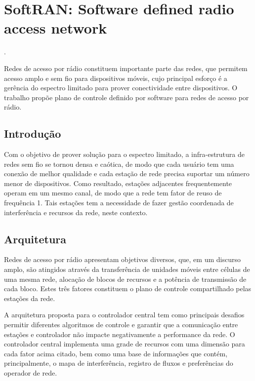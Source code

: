 
\chapter{SoftRAN: Software defined radio access network}
 \cite{gudipati2013softran}.

Redes de acesso por rádio constituem importante parte das redes, que permitem acesso amplo e sem fio para dispositivos móveis, cujo principal esforço é a gerência do espectro limitado para prover conectividade entre dispositivos. O trabalho propõe plano de controle definido por software para redes de acesso por rádio.


\section*{Introdução}

Com o objetivo de prover solução para o espectro limitado, a infra-estrutura de redes sem fio se tornou densa e caótica, de modo que cada usuário tem uma conexão de melhor qualidade e cada estação de rede precisa suportar um número menor de dispositivos. Como resultado, estações adjacentes frequentemente operam em um mesmo canal, de modo que a rede tem fator de reuso de frequência 1. Tais estações tem a necessidade de fazer gestão coordenada de interferência e recursos da rede, neste contexto.


\section*{Arquitetura}

Redes de acesso por rádio apresentam objetivos diversos, que, em um discurso amplo, são atingidos através da transferência de unidades móveis entre células de uma mesma rede, alocação de blocos de recursos e a potência de transmissão de cada bloco. Estes três fatores constituem o plano de controle compartilhado pelas estações da rede.

A arquitetura proposta para o controlador central tem como principais desafios permitir diferentes algoritmos de controle e garantir que a comunicação entre estações e controlador não impacte negativamente a performance da rede. O controlador central implementa uma grade de recursos com uma dimensão para cada fator acima citado, bem como uma base de informações que contém, principalmente, o mapa de interferência, registro de fluxos e preferências do operador de rede.


